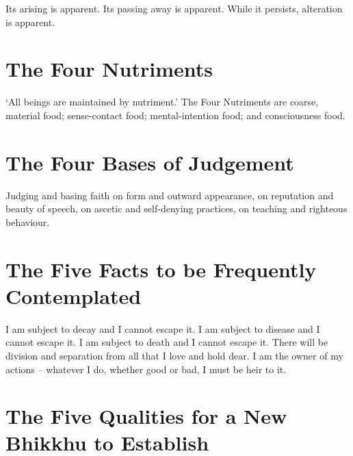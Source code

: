 Its arising is apparent. Its passing away is apparent. While it persists,
alteration is apparent.


\ifhandbookedition
\vspace*{-1.1\baselineskip}
\enlargethispage{\baselineskip}
\fi

\section*{The Four Nutriments}

‘All beings are maintained by nutriment.’ The Four Nutriments are coarse,
material food; sense-contact food; mental-intention food; and consciousness
food.


\ifhandbookedition
\vspace*{-1.1\baselineskip}
\fi

\section*{The Four Bases of Judgement}

Judging and basing faith on form and outward appearance, on reputation and
beauty of speech, on ascetic and self-denying practices, on teaching and
righteous behaviour.


\ifhandbookedition
\vspace*{-1.1\baselineskip}
\fi

\section*{The Five Facts to be Frequently Contemplated}

I am subject to decay and I cannot escape it. I am subject to disease and I
cannot escape it. I am subject to death and I cannot escape it. There will be
division and separation from all that I love and hold dear. I am the owner of my
actions -- whatever I do, whether good or bad, I must be heir to it.


\ifhandbookedition
\vspace*{-\baselineskip}
\fi

\section*{The Five Qualities for a New Bhikkhu to Establish}

